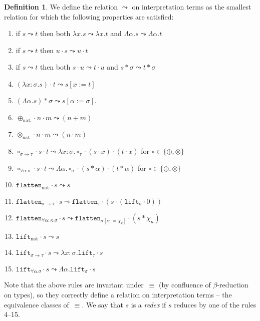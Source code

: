 \documentclass[a4paper,UKenglish,cleveref,autoref,numberwithinsect]{lipics-v2019}
\theoremstyle{definition}
\newtheorem{defn}[theorem]{Definition}
\newcommand{\arrtype}{\rightarrow}
\newcommand{\quant}[2]{\forall #1.#2}
\newcommand{\app}[2]{#1 \cdot #2}
\newcommand{\tapp}[2]{#1 * #2}
\newcommand{\subst}[2]{#1:=#2}
\newcommand{\abs}[2]{\lambda #1.#2}
\newcommand{\tabs}[2]{\Lambda #1.#2}
\newcommand{\arrW}{\leadsto}
\newcommand{\nat}{\mathtt{nat}}
\newcommand{\flatten}{\mathtt{flatten}}
\newcommand{\lift}{\mathtt{lift}}
\begin{document}
\begin{defn}
  We define the relation $\arrW$ on interpretation terms as the
  smallest relation for which the following properties are satisfied:
  \begin{enumerate}
  \item\label{arrW:mono:abs}
    if $s \arrW t$ then both $\abs{x}{s} \arrW \abs{x}{t}$ and
    $\tabs{\alpha}{s} \arrW \tabs{\alpha}{t}$
  \item\label{arrW:mono:right}
    if $s \arrW t$ then $\app{u}{s} \arrW \app{u}{t}$
  \item\label{arrW:mono:left}
    if $s \arrW t$ then both $\app{s}{u} \arrW \app{t}{u}$ and
    $\tapp{s}{\sigma} \arrW \tapp{t}{\sigma}$
  \item\label{arrW:beta:abs} $\app{(\abs{x:\sigma}{s})}{t} \arrW
    s[\subst{x}{t}]$
  \item\label{arrW:beta:tabs} $\tapp{(\tabs{\alpha}{s})}{\sigma}
    \arrW s[\subst{\alpha}{\sigma}]$.
  \item\label{arrW:plus:base}
    $\app{\app{\oplus_{\nat}}{n}}{m} \arrW (n+m)$
  \item\label{arrW:times:base} $\app{\app{\otimes_{\nat}}{n}}{m}
    \arrW (n \cdot m)$
  \item\label{arrW:circ:arrow} $\app{\app{\circ_{\sigma \arrtype
        \tau}}{s}}{t} \arrW
    \abs{x:\sigma}{\app{\app{\circ_\tau}{(\app{s}{x})}}{(\app{t}{x})}}$
    for $\circ \in \{ \oplus, \otimes \}$
  \item\label{arrW:circ:forall}
    $\app{\app{\circ_{\quant{\alpha}{\sigma}}}{s}}{t} \arrW
    \tabs{\alpha}{\app{\app{\circ_\sigma}{(\tapp{s}{\alpha})}}{(
        \tapp{t}{\alpha})}}$ for $\circ \in \{ \oplus, \otimes \}$
  \item $\app{\flatten_\nat}{s} \arrW s$
  \item $\app{\flatten_{\sigma \arrtype \tau}}{s} \arrW
    \app{\flatten_\tau}{(\app{s}{(\app{\lift_\sigma}{0})})}$
  \item $\app{\flatten_{\quant{\alpha:\kappa}{\sigma}}}{s} \arrW
    \app{\flatten_{\sigma[\subst{\alpha}{\chi_\kappa}]}}{(\tapp{s}{\chi_\kappa})}$
  \item $\app{\lift_\nat}{s} \arrW s$
  \item $\app{\lift_{\sigma \arrtype \tau}}{s} \arrW
    \abs{x:\sigma}{\app{\lift_{\tau}}{s}}$
  \item $\app{\lift_{\quant{\alpha}{\sigma}}}{s} \arrW
    \tabs{\alpha}{\app{\lift_{\sigma}}{s}}$
  \end{enumerate}
  Note that the above rules are invariant under~$\equiv$ (by
  confluence of $\beta$-reduction on types), so they correctly define
  a relation on interpretation terms -- the equivalence classes
  of~$\equiv$. We say that $s$ is a \emph{redex} if $s$ reduces by one
  of the rules 4--15.


\end{defn}
\end{document}
